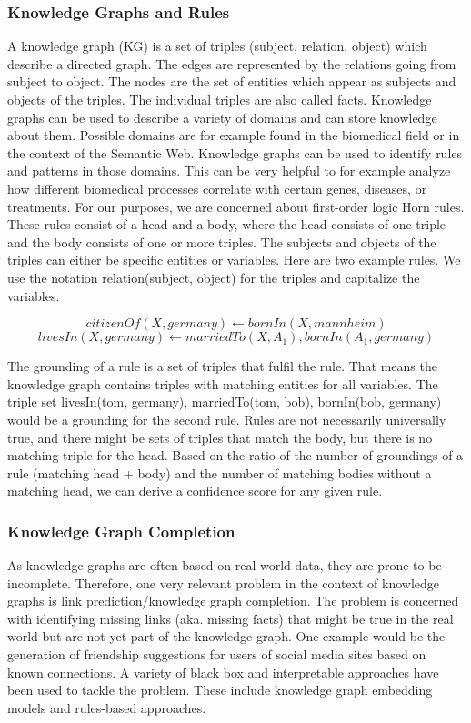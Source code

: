 \documentclass[runningheads]{llncs}
\begin{document}
\subsubsection{Knowledge Graphs and Rules} 
A knowledge graph (KG) is a set of triples (subject, relation, object) which describe a directed graph. The edges are represented by the relations going from subject to object. The nodes are the set of entities which appear as subjects and objects of the triples. The individual triples are also called facts. Knowledge graphs can be used to describe a variety of domains and can store knowledge about them. Possible domains are for example found in the biomedical field or in the context of the Semantic Web. Knowledge graphs can be used to identify rules and patterns in those domains. This can be very helpful to for example analyze how different biomedical processes correlate with certain genes, diseases, or treatments. For our purposes, we are concerned about first-order logic Horn rules. These rules consist of a head and a body, where the head consists of one triple and the body consists of one or more triples. The subjects and objects of the triples can either be specific entities or variables. Here are two example rules. We use the notation relation(subject, object) for the triples and capitalize the variables.

\begin{equation}
citizenOf(X, germany) \leftarrow bornIn(X, mannheim) 
\end{equation}
\begin{equation}
livesIn(X, germany) \leftarrow marriedTo(X, A_1), bornIn(A_1, germany)
\end{equation}

The grounding of a rule is a set of triples that fulfil the rule. That means the knowledge graph contains triples with matching entities for all variables. The triple set {livesIn(tom, germany), marriedTo(tom, bob), bornIn(bob, germany)} would be a grounding for the second rule. Rules are not necessarily universally true, and there might be sets of triples that match the body, but there is no matching triple for the head. Based on the ratio of the number of groundings of a rule (matching head + body) and the number of matching bodies without a matching head, we can derive a confidence score for any given rule.

\subsubsection{Knowledge Graph Completion} 
As knowledge graphs are often based on real-world data, they are prone to be incomplete. Therefore, one very relevant problem in the context of knowledge graphs is link prediction/knowledge graph completion. The problem is concerned with identifying missing links (aka. missing facts) that might be true in the real world but are not yet part of the knowledge graph. One example would be the generation of friendship suggestions for users of social media sites based on known connections. A variety of black box and interpretable approaches have been used to tackle the problem. These include knowledge graph embedding models and rules-based approaches.
\end{document}
